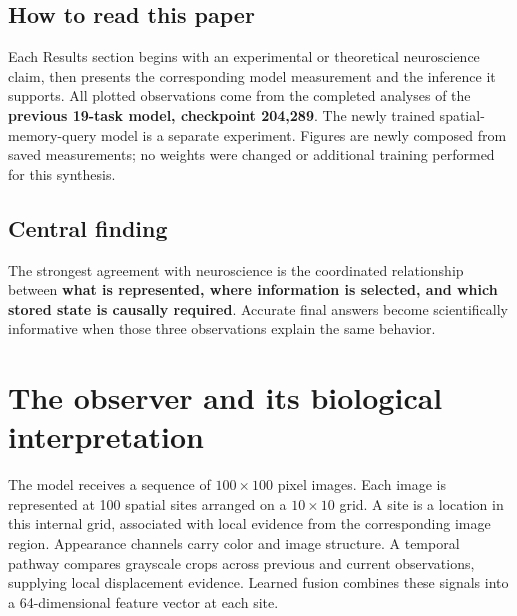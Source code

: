 \documentclass[11pt,letterpaper]{article}
\begin{document}
\subsection*{How to read this paper}
Each Results section begins with an experimental or theoretical neuroscience claim, then presents the corresponding model measurement and the inference it supports. All plotted observations come from the completed analyses of the \textbf{previous 19-task model, checkpoint 204,289}. The newly trained spatial-memory-query model is a separate experiment. Figures are newly composed from saved measurements; no weights were changed or additional training performed for this synthesis.

\subsection*{Central finding}
The strongest agreement with neuroscience is the coordinated relationship between \textbf{what is represented, where information is selected, and which stored state is causally required}. Accurate final answers become scientifically informative when those three observations explain the same behavior.

\clearpage
\section*{The observer and its biological interpretation}
The model receives a sequence of $100\times100$ pixel images. Each image is represented at 100 spatial sites arranged on a $10\times10$ grid. A site is a location in this internal grid, associated with local evidence from the corresponding image region. Appearance channels carry color and image structure. A temporal pathway compares grayscale crops across previous and current observations, supplying local displacement evidence. Learned fusion combines these signals into a 64-dimensional feature vector at each site.
\end{document}
